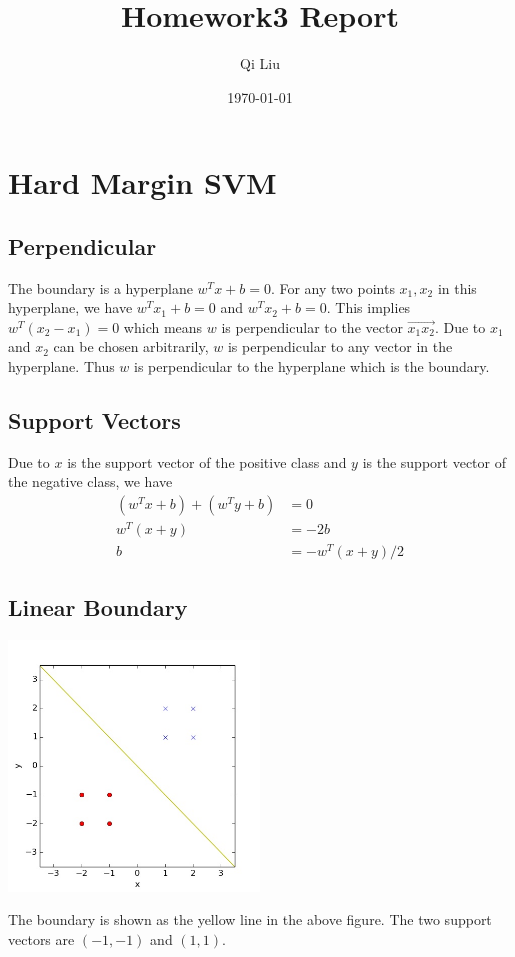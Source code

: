 \documentclass{article}
\title{Homework3 Report}
\author{Qi Liu}
\date{\today}
\begin{document}
	
\maketitle

\section{Hard Margin SVM}

\subsection{Perpendicular}
The boundary is a hyperplane $w^Tx+b=0$. For any two points $x_1, x_2$ in this hyperplane, we have $w^Tx_1+b=0$ and $w^Tx_2+b=0$. This implies $w^T(x_2-x_1)=0$ which means $w$ is perpendicular to the vector $\overrightarrow{x_1x_2}$. Due to $x_1$ and $x_2$ can be chosen arbitrarily, $w$ is perpendicular to any vector in the hyperplane. Thus $w$ is perpendicular to the hyperplane which is the boundary.

\subsection{Support Vectors}
Due to $x$ is the support vector of the positive class and $y$ is the support vector of the negative class, we have
\begin{align*}
(w^Tx+b)+(w^Ty+b)&=0 \\ w^T(x+y)&=-2b \\ b&=-w^T(x+y)/2
\end{align*}

\subsection{Linear Boundary}
\begin{center}
\includegraphics[width=0.5\textwidth]{../result/linear_boundary.jpg}
\end{center}
The boundary is shown as the yellow line in the above figure. The two support vectors are $(-1,-1)$ and $(1, 1)$.
\end{document}
